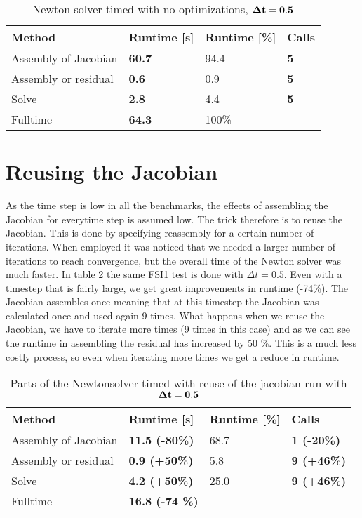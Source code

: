 \begin{table}[H]
\centering
\caption{Newton solver timed with no optimizations, $\bold{\Delta t = 0.5}$ }
\label{no_opt}
\begin{tabular}{|l|l|l|l|}
\hline
Method               & \textbf{Runtime {{[}}s{{]}}} & Runtime {{[}}\%{{]}} & \textbf{Calls} \\ \hline
Assembly of Jacobian & \textbf{60.7}                    & 94.4                     & \textbf{5}     \\ \hline
Assembly or residual & \textbf{0.6}                     & 0.9                      & \textbf{5}     \\ \hline
Solve                & \textbf{2.8}                     & 4.4                      & \textbf{5}     \\ \hline
Fulltime             & \textbf{64.3}                    & 100\%                    & -                \\ \hline
\end{tabular}
\end{table}

\section{Reusing the Jacobian}
As the time step is low in all the benchmarks, the effects of assembling the Jacobian for everytime step is assumed low. The trick therefore is to reuse the Jacobian. This is done by specifying reassembly for a certain number of iterations. When employed it was noticed that we needed a larger number of iterations to reach convergence, but the overall time of the Newton solver was much faster.
In table \ref{jac_reuse} the same FSI1 test is done with $\Delta t = 0.5$. Even with a timestep that is fairly large, we get great improvements in runtime (-74\%). The Jacobian assembles once meaning that at this timestep the Jacobian was calculated once and used again 9 times. What happens when we reuse the Jacobian, we have to iterate more times (9 times in this case) and as we can see the runtime in assembling the residual has increased by 50 \%. This is a much less costly process, so even when iterating more times we get a reduce in runtime.

\begin{table}[H]
\centering
\caption{Parts of the Newtonsolver timed with reuse of the jacobian run with $\bold{\Delta t = 0.5}$}
\label{jac_reuse}
\begin{tabular}{|l|l|l|l|}
\hline
Method & \textbf{Runtime {[}s{]}} & Runtime {[}\%{]} & \textbf{Calls} \\ \hline
Assembly of Jacobian & \textbf{11.5 (-80\%)} & 68.7 & \textbf{1 (-20\%)} \\ \hline
Assembly or residual & \textbf{0.9 (+50\%)} & 5.8 & \textbf{9 (+46\%)} \\ \hline
Solve & \textbf{4.2 (+50\%)} & 25.0 & \textbf{9 (+46\%)} \\ \hline
Fulltime & \textbf{16.8 (-74 \%)} & - & - \\ \hline
\end{tabular}
\end{table}


